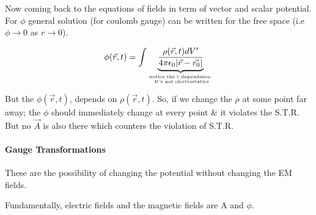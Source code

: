 \documentclass[a4paper]{article}
\numberwithin{equation}{subsection}  %
\begin{document}
 Now coming back to the equations of fields in term of vector and scalar potential. For $\phi$ general solution (for coulomb gauge) can be written for the free space (i.e $\phi \to 0$ as $r \to 0$).
 
 $$ \phi (\vec{r},t) = \int \underbrace{\frac{\rho(\vec{r},t) d V'}{4\pi \epsilon_0 |\vec{r}-\vec{r_0}|}}_ {\text{notice the t dependence.} \atop \text{ It's not electrostatics}} $$
 
 But the $\phi(\vec{r},t)$, depends on $\rho(\vec{r},t)$. So, if we change the $\rho$ at some point far away; the $\phi$ should immediately change at every point \& 
 it violates the S.T.R. But no $\vec{A}$ is also there which counters the violation of S.T.R.

\paragraph{Gauge Transformations} These are the possibility of changing the potential without changing the EM fields.

Fundamentally, electric fields and the magnetic fields are A and $\phi$.
\end{document}
